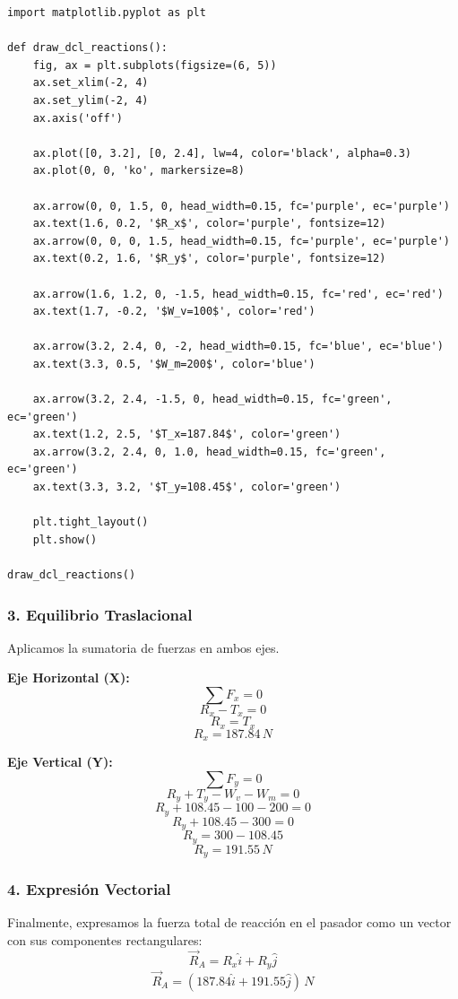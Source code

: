 \documentclass[12pt, a4paper]{article}
\begin{document}
\begin{lstlisting}
import matplotlib.pyplot as plt

def draw_dcl_reactions():
    fig, ax = plt.subplots(figsize=(6, 5))
    ax.set_xlim(-2, 4)
    ax.set_ylim(-2, 4)
    ax.axis('off')
    
    ax.plot([0, 3.2], [0, 2.4], lw=4, color='black', alpha=0.3)
    ax.plot(0, 0, 'ko', markersize=8)
    
    ax.arrow(0, 0, 1.5, 0, head_width=0.15, fc='purple', ec='purple')
    ax.text(1.6, 0.2, '$R_x$', color='purple', fontsize=12)
    ax.arrow(0, 0, 0, 1.5, head_width=0.15, fc='purple', ec='purple')
    ax.text(0.2, 1.6, '$R_y$', color='purple', fontsize=12)
    
    ax.arrow(1.6, 1.2, 0, -1.5, head_width=0.15, fc='red', ec='red')
    ax.text(1.7, -0.2, '$W_v=100$', color='red')
    
    ax.arrow(3.2, 2.4, 0, -2, head_width=0.15, fc='blue', ec='blue')
    ax.text(3.3, 0.5, '$W_m=200$', color='blue')
    
    ax.arrow(3.2, 2.4, -1.5, 0, head_width=0.15, fc='green', ec='green')
    ax.text(1.2, 2.5, '$T_x=187.84$', color='green')
    ax.arrow(3.2, 2.4, 0, 1.0, head_width=0.15, fc='green', ec='green')
    ax.text(3.3, 3.2, '$T_y=108.45$', color='green')

    plt.tight_layout()
    plt.show()

draw_dcl_reactions()
\end{lstlisting}

\subsubsection*{3. Equilibrio Traslacional}
Aplicamos la sumatoria de fuerzas en ambos ejes.

\textbf{Eje Horizontal (X):}
$$\sum F_x = 0$$
$$R_x - T_x = 0$$
$$R_x = T_x$$
$$R_x = 187.84 \, \si{N}$$

\textbf{Eje Vertical (Y):}
$$\sum F_y = 0$$
$$R_y + T_y - W_v - W_m = 0$$
$$R_y + 108.45 - 100 - 200 = 0$$
$$R_y + 108.45 - 300 = 0$$
$$R_y = 300 - 108.45$$
$$R_y = 191.55 \, \si{N}$$

\subsubsection*{4. Expresión Vectorial}
Finalmente, expresamos la fuerza total de reacción en el pasador como un vector con sus componentes rectangulares:
$$\vec{R}_A = R_x \hat{i} + R_y \hat{j}$$
$$\vec{R}_A = (187.84 \hat{i} + 191.55 \hat{j}) \, \si{N}$$
\end{document}

